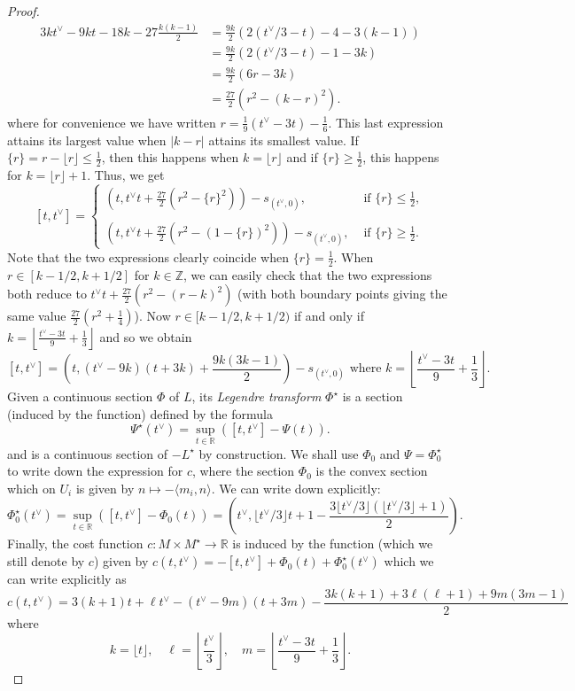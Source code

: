 \documentclass{article}
\newcommand{\RR}{\mathbb{R}}
\newcommand{\ZZ}{\mathbb{Z}}
\begin{document}
\begin{proof}
\begin{align*}
    3kt^\vee-9kt-18k-27\frac{k(k-1)}{2}&=\frac{9k}{2}\left(2(t^\vee/3 - t)-4-3(k-1)\right)\\
    &=\frac{9k}{2}\left(2(t^\vee/3 - t)-1-3k\right)\\
    &= \frac{9k}{2}(6r-3k)\\
    &= \frac{27}{2}(r^2-(k-r)^2).
\end{align*}
where for convenience we have written $r=\frac{1}{9}(t^\vee-3t)-\frac{1}{6}$. This last expression attains its largest value when $|k-r|$ attains its smallest value. If $\{r\} = r-\lfloor r \rfloor \leq\frac{1}{2}$, then this happens when $k=\lfloor r \rfloor$ and if $\{r\} \geq \frac{1}{2}$, this happens for $k=\lfloor r \rfloor +1$. Thus, we get 
\[
[t,t^\vee] =
\begin{cases}
    (t, t^\vee t + \frac{27}{2}(r^2-\{r\}^2))-s_{(t^\vee,0)}, & \textrm{ if } \{r\}\leq \frac{1}{2},\\
    \\
    (t, t^\vee t + \frac{27}{2}(r^2-(1-\{r\})^2))-s_{(t^\vee,0)}, & \textrm{ if } \{r\}\geq \frac{1}{2}.
\end{cases}
\]
Note that the two expressions clearly coincide when $\{r\} = \frac{1}{2}$. When $r\in[k-1/2,k+1/2]$ for $k\in \ZZ$, we can easily check that the two expressions both reduce to $t^\vee t + \frac{27}{2}(r^2-(r-k)^2)$ (with both boundary points giving the same value $\frac{27}{2}(r^2+\frac{1}{4})$). Now $r\in [k-1/2,k+1/2)$ if and only if $k=\left\lfloor \frac{t^\vee-3t}{9}+\frac{1}{3}\right\rfloor$ and so we obtain
\[
[t,t^\vee]=\left(t,(t^\vee-9k)(t+3k)+\frac{9k(3k-1)}{2}\right) -s_{(t^\vee,0)} \textrm{ where } k=\left\lfloor \frac{t^\vee-3t}{9}+\frac{1}{3}\right\rfloor.
\]
Given a continuous section $\Phi$ of $L$, its \emph{Legendre transform} $\Phi^\star$ is a section (induced by the function) defined by the formula 
\[
\Psi^\star(t^\vee) = \sup_{t\in \RR} \left([t,t^\vee]-\Psi(t)\right).
\]
and is a continuous section of $-L^\star$ by construction. We shall use $\Phi_0$ and $\Psi = \Phi_0^\star$ to write down the expression for $c$, where the section $\Phi_0$ is the convex section which on $U_i$ is given by $n\mapsto -\langle m_i,n\rangle$. We can write down explicitly:
\[
\Phi_0^\star(t^\vee)=\sup_{t\in \RR} \left([t,t^\vee]-\Phi_0(t)\right) = \left(t^\vee, \lfloor t^\vee /3 \rfloor t + 1-\frac{3\lfloor t^\vee /3 \rfloor(\lfloor t^\vee /3 \rfloor+1)}{2} \right).
\]
Finally, the cost function $c:M\times M^\star\to \RR$ is induced by the function (which we still denote by $c$) given by $c(t,t^\vee)=-[t,t^\vee]+\Phi_0(t)+\Phi_0^\star(t^\vee)$ which we can write explicitly as 
\begin{equation}\label{eq:Cost}
c(t,t^\vee) = 3(k+1)t + \ell t^\vee-(t^\vee -9m)(t+3m) - \frac{3k(k+1)+3\ell(\ell+1)+9m(3m-1)}{2}
\end{equation}
where
\[
k= \lfloor t \rfloor, \quad \ell = \left\lfloor \frac{t^\vee}{3}\right\rfloor, \quad m =\left \lfloor \frac{t^\vee-3t}{9}+\frac{1}{3}\right\rfloor.
\]
\end{proof}
\end{document}

